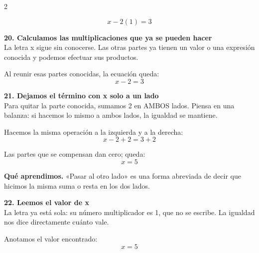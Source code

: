 \documentclass[11pt,a4paper,landscape]{article}
\begin{document}
\begin{multicols*}{2}
\begin{minipage}{\linewidth}
\[x - 2\left(1\right)=3\]
\end{minipage}\par\medskip
\noindent\begin{minipage}{\linewidth}\textbf{20. Calculamos las multiplicaciones que ya se pueden hacer}\\[2pt]La letra x sigue sin conocerse. Las otras partes ya tienen un valor o una expresión conocida y podemos efectuar sus productos.
\par{}\par\smallskip
\par\smallskip Al reunir esas partes conocidas, la ecuación queda:
\[x - 2=3\]
\end{minipage}\par\medskip
\noindent\begin{minipage}{\linewidth}\textbf{21. Dejamos el término con x solo a un lado}\\[2pt]Para quitar la parte conocida, sumamos 2 en AMBOS lados. Piensa en una balanza: si hacemos lo mismo a ambos lados, la igualdad se mantiene.
\par\smallskip Hacemos la misma operación a la izquierda y a la derecha:
\[x - 2 + 2=3 + 2\]
\par\smallskip Las partes que se compensan dan cero; queda:
\[x=5\]
\par\smallskip\textbf{Qué aprendimos.} «Pasar al otro lado» es una forma abreviada de decir que hicimos la misma suma o resta en los dos lados.
\end{minipage}\par\medskip
\noindent\begin{minipage}{\linewidth}\textbf{22. Leemos el valor de x}\\[2pt]La letra ya está sola: su número multiplicador es 1, que no se escribe. La igualdad nos dice directamente cuánto vale.
\par\smallskip Anotamos el valor encontrado:
\[x=5\]
\end{minipage}\par\medskip

\end{multicols*}
\end{document}
